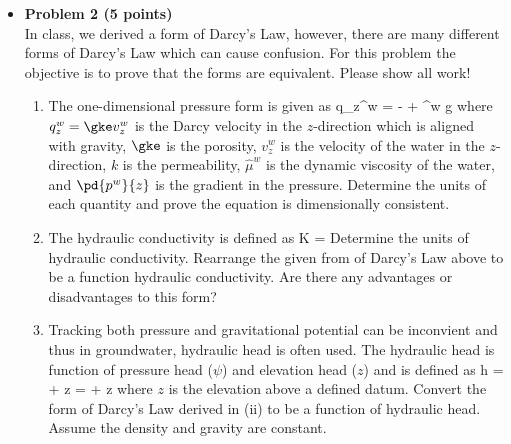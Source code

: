 \documentclass[11pt]{report}
\begin{document}
\begin{itemize}
\item {\bf Problem 2 (5 points) } \\
In class, we derived a form of Darcy's Law, however, there are many different forms of Darcy's Law which can cause confusion. For this problem the objective is to prove that the forms are equivalent. Please show all work!

\begin{enumerate}[label=(\roman*)]
    \item The one-dimensional pressure form is given as
    \beq
        q_z^w = - \lp {} + \rho^w g \rp
    \eeq
    where $q_z^w = \gke v_z^w$ is the Darcy velocity in the $z$-direction which is aligned with gravity, $\gke$ is the porosity, $v_z^w$ is the velocity of the water in the $z$-direction, $k$ is the permeability, $\hat{\mu}^w$ is the dynamic viscosity of the water, and $\pd{p^w}{z}$ is the gradient in the pressure. Determine the units of each quantity and prove the equation is dimensionally consistent. 
    \item The hydraulic conductivity is defined as
    \beq
        K = 
    \eeq 
    Determine the units of hydraulic conductivity. Rearrange the given from of Darcy's Law above to be a function hydraulic conductivity. Are there any advantages or disadvantages to this form? 
    \item Tracking both pressure and gravitational potential can be inconvient and thus in groundwater, hydraulic head is often used. The hydraulic head is function of pressure head ($\psi$) and elevation head ($z$) and is defined as
    \beq
        h = \psi + z =  + z
    \eeq
    where $z$ is the elevation above a defined datum. Convert the form of Darcy's Law derived in (ii) to be a function of hydraulic head. Assume the density and gravity are constant.  
\end{enumerate}
    

\end{itemize}
\end{document}
